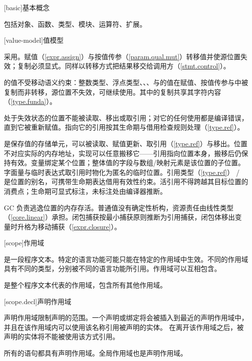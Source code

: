 
[basic]{基本概念}

\pnum
{}包括对象、函数、类型、模块、运算符、扩展。

[value-model]{值模型}

\pnum
\X{}采用。赋值（\ref{expr.assign}）与按值传参（\ref{param.qual.mut}）转移值并使源位置失效；复制必须显式。同样以转移方式把结果移交给调用方（\ref{stmt.control}）。

\pnum
{}的值不受移动语义约束：整数类型、浮点类型、、、与的值在赋值、按值传参与中被复制而非转移，源位置不失效，可继续使用。其中的复制共享其字符内容（\ref{type.funda}）。

\pnum
处于失效状态的位置不能被读取、移出或取引用；对它的任何使用都是编译错误，直到它被重新赋值。指向它的引用按其生命期与借用检查规则处理（\ref{type.ref}）。

\pnum
{}是保存值的存储单元，可以被读取、赋值更新、取引用（\ref{type.ref}）与移出。位置不对应实际的内存地址，实现可以任意搬移它——引用指向位置本身，搬移后仍保持有效。变量绑定某个位置；整体值的字段与数组/映射元素是该位置的子位置。字面量与临时表达式取引用时物化为匿名的临时位置。引用类型（\ref{type.ref}） / 是位置的别名，可携带生命期表达借用有效性约束。活引用不得跨越其目标位置的消费点；生命期可显式标注，未标注处由编译器推断。

\pnum
GC 负责逃逸位置的内存存活。普通值没有确定性析构，资源责任由线性类型（\ref{core.linear}）承担。闭包捕获按最小捕获原则推断为引用捕获，闭包体移出变量时升格为移动捕获（\ref{expr.closure}）。

[scope]{作用域}

\pnum
{}是一段程序文本。特定的语言功能可能只能在特定的作用域中生效。不同的作用域具有不同的类型，分别被不同的语言功能所引用。作用域可以互相包含。

\pnum
{}是整个程序文本代表的作用域，包含所有其他作用域。

[scope.decl]{声明作用域}

\pnum
声明作用域限制声明的范围。一个声明或绑定将会被插入到最近的声明作用域中，并且在该作用域内可以使用该名称引用被声明的实体。
在离开该作用域之后，被声明的实体将不能被使用该方式引用。

\pnum
所有的语句都具有声明作用域。全局作用域也是声明作用域。

